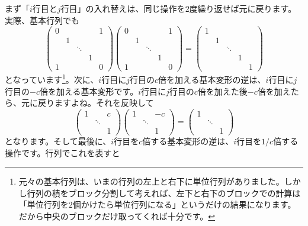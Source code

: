 まず「$i$行目と$j$行目」の入れ替えは、同じ操作を$2$度繰り返せば元に戻ります。実際、基本行列でも
\[
\begin{pmatrix}
0 & & & & 1 \\
& 1 & & \\
& & \ddots & \\
& & & 1 \\
1 & & & & 0
\end{pmatrix}
\begin{pmatrix}
0 & & & & 1 \\
& 1 & & \\
& & \ddots & \\
& & & 1 \\
1 & & & & 0
\end{pmatrix}
=
\begin{pmatrix}
1 & & & & \\
& 1 & & \\
& & \ddots & \\
& & & 1 \\
& & & & 1
\end{pmatrix}
\]
となっています\footnote{元々の基本行列は、いまの行列の左上と右下に単位行列がありました。しかし行列の積をブロック分割して考えれば、左下と右下のブロックでの計算は「単位行列を$2$個かけたら単位行列になる」というだけの結果になります。だから中央のブロックだけ取ってくれば十分です。}。次に、$i$行目に$j$行目の$c$倍を加える基本変形の逆は、$i$行目に$j$行目の$-c$倍を加える基本変形です。$i$行目に$j$行目の$c$倍を加えた後$-c$倍を加えたら、元に戻りますよね。それを反映して
\[
\begin{pmatrix}
1 & & c \\
 & \ddots & \\
 & & 1
\end{pmatrix}
\begin{pmatrix}
1 & & -c \\
 & \ddots & \\
 & & 1
\end{pmatrix}
=
\begin{pmatrix}
1 & & \\
 & \ddots & \\
 & & 1
\end{pmatrix}
\]
となります。そして最後に、$i$行目を$c$倍する基本変形の逆は、$i$行目を$1/c$倍する操作です。行列でこれを表すと
